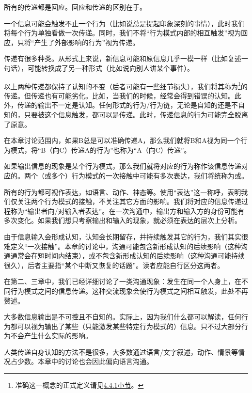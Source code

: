 \begin{examples}
所有的传递都是回应。回应和传递的区别在于。

一个信息可能会触发不止一个行为（比如说总是提起印象深刻的事情），此时我们将每个行为单独看做一次传递。同时，我们不将“行为模式内部的相互触发”视为回应，只将“产生了外部影响的行为”视为传递。

传递有很多种类。从形式上来说，新信息可能和原信息几乎一模一样（比如复述一句话），可能转换成了另一种形式（比如说向别人讲某个事件）。

以上两种传递都保持了认知的不变（后者可能有一些细节损失），我们将其称为\footnote{准确这一概念的正式定义请见\hyperref[def:准确]{4.4.1小节}。}的传递。但传递也有可能劣化。比如，当我们的时候，经常会得到错误的认知。此外，传递的输出不一定是认知。任何形式的行为/行为链，无论是自知的还是不自知的，只要被这个信息触发，都可以是传递。此时，传递信息的行为可能完全脱离了原意。

在本章讨论范围内，如果B总是可以准确传递A，那么我们就将B和A视为同一个行为模式，将“B（向C）传递A的行为”也称为“A（向C）传递”。
\end{examples}
如果输出信息的现象是某个行为模式，那么我们就将对应的行为称作该信息传递对应的。两个（或多个）行为模式的一次接触中可能有多次表达，我们将统称为或。
\begin{explain}
所有的行为都可视作表达，如语言、动作、神态等。使用“表达”这一称呼，表明我们仅关注两个行为模式的接触，不关注其它方面的影响。我们将对应的信息传递过程称为“输出者向/对输入者表达”。在一次沟通中，输出方和输入方的身份可能有多次变化。如果我们想只考察输出和输入的现象，就必须在表达的层次上分析。

由于信息输入会形成认知，认知会长期留存，并持续触发其它的行为，我们其实很难定义“一次接触”。本章的讨论中，沟通可能包含新形成认知的后续影响（这种沟通通常会在短时间内结束），或不包含新形成认知的后续影响（这种沟通可能持续很久），后者主要指“某个中断又恢复的话题”。读者应能自行区分这两者。

在第二、三章中，我们已经详细讨论了一类沟通现象：发生在同一个人身上，在不同行为模式之间的信息传递。这种交流现象会使行为模式之间相互触发，此处不再赘述。

大多数信息输出是不可控且不自知的。实际上，因为我们什么都可以解读，任何行为都可以视为输出了某些（只能激发某些特定行为模式的）信息。只不过大部分行为不会产生什么实际的影响。

人类传递自身认知的方法不是很多，大多数通过语言/文字叙述，动作、情景等情况占少数。本章中的讨论也会因此偏向语言沟通。
\end{explain}
